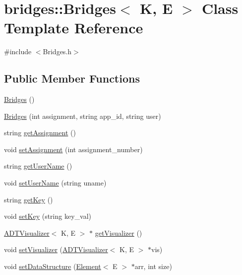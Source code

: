 \hypertarget{classbridges_1_1_bridges}{}\section{bridges\+:\+:Bridges$<$ K, E $>$ Class Template Reference}
\label{classbridges_1_1_bridges}


{\ttfamily \#include $<$Bridges.\+h$>$}

\subsection*{Public Member Functions}
\begin{DoxyCompactItemize}
\item 
\hyperlink{classbridges_1_1_bridges_a93c02344480d84125c482ceaf8f76dd6}{Bridges} ()
\item 
\hyperlink{classbridges_1_1_bridges_ac3aee526d2bb26e18e9258bee9bdd89f}{Bridges} (int assignment, string app\+\_\+id, string user)
\item 
string \hyperlink{classbridges_1_1_bridges_ae48d408d66c6f6d41da2339daedf2b69}{get\+Assignment} ()
\item 
void \hyperlink{classbridges_1_1_bridges_a5ff36234e3b9f53fa2db9eafa1151188}{set\+Assignment} (int assignment\+\_\+number)
\item 
string \hyperlink{classbridges_1_1_bridges_a72e0a71fa6eab84d010b33b475e931a5}{get\+User\+Name} ()
\item 
void \hyperlink{classbridges_1_1_bridges_a281a9bdcc0b2c4a910e852624859d4f9}{set\+User\+Name} (string uname)
\item 
string \hyperlink{classbridges_1_1_bridges_a0114d6681a81d253853dc79a521c9874}{get\+Key} ()
\item 
void \hyperlink{classbridges_1_1_bridges_a17863f55aef338984342a6ce1d277a38}{set\+Key} (string key\+\_\+val)
\item 
\hyperlink{classbridges_1_1_a_d_t_visualizer}{A\+D\+T\+Visualizer}$<$ K, E $>$ $\ast$ \hyperlink{classbridges_1_1_bridges_a8d3c56a05d697828e6e8c9f43f761972}{get\+Visualizer} ()
\item 
void \hyperlink{classbridges_1_1_bridges_a45a715493fa1e768d6401ff7829b05d3}{set\+Visualizer} (\hyperlink{classbridges_1_1_a_d_t_visualizer}{A\+D\+T\+Visualizer}$<$ K, E $>$ $\ast$vis)
\item 
void \hyperlink{classbridges_1_1_bridges_a5105e2cfcde23d1dfb475eac967d55ff}{set\+Data\+Structure} (\hyperlink{classbridges_1_1_element}{Element}$<$ E $>$ $\ast$arr, int size)

\end{DoxyCompactItemize}
